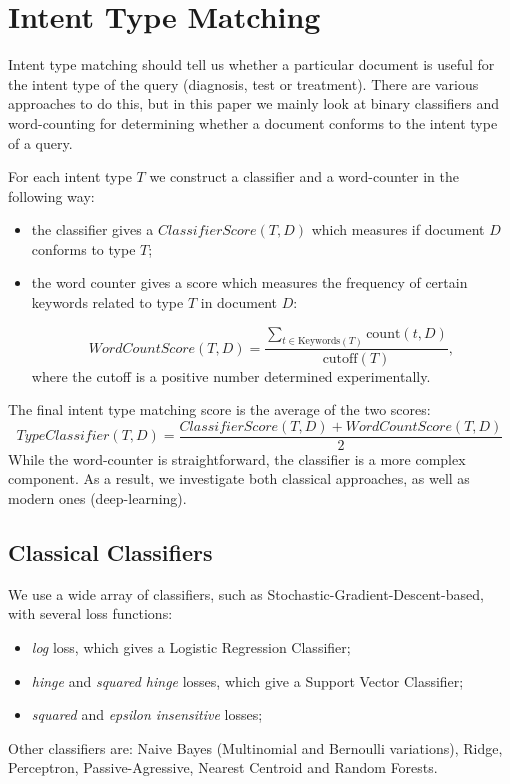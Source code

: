 \section{Intent Type Matching}
Intent type matching should tell us whether a particular document is useful for the intent type of the query 
(diagnosis, test or treatment). There are various approaches to do this, but in this paper we mainly look at
binary classifiers and word-counting for determining whether a document conforms to the intent type of a query.

For each intent type $T$ we construct a classifier and a word-counter in the following way:
\begin{itemize}
 \item the classifier gives a $ClassifierScore(T,D)$ which measures if document $D$ conforms to type $T$;
 \item the word counter gives a score which measures the frequency of certain keywords related to type $T$ in document $D$:
 
 \[WordCountScore(T,D) = \displaystyle\frac{\displaystyle\sum_{t\in \text{Keywords}(T)} \text{count}(t,D)}{\text{cutoff}(T)},\]
  where the cutoff is a positive number determined experimentally.
\end{itemize}


The final intent type matching score is the average of the two scores:
\[
 TypeClassifier(T, D) = \displaystyle\frac{ClassifierScore(T,D) +  WordCountScore(T,D)}{2}
\]
While the word-counter is straightforward, the classifier is a more complex component. As a result, we investigate both
classical approaches, as well as modern ones (deep-learning).

\subsection{Classical Classifiers}

We use a wide array of classifiers, such as Stochastic-Gradient-Descent-based, with several loss functions:
    \begin{itemize}  \setlength\itemsep{-0.5em}
    \item \emph{log} loss, which gives a Logistic Regression Classifier;
    \item \emph{hinge} and \emph{squared hinge} losses, which give a Support Vector Classifier;
    \item \emph{squared} and \emph{epsilon insensitive} losses;
    \end{itemize}
Other classifiers are: Naive Bayes (Multinomial and Bernoulli variations), Ridge, Perceptron, Passive-Agressive, Nearest Centroid
and Random Forests.

